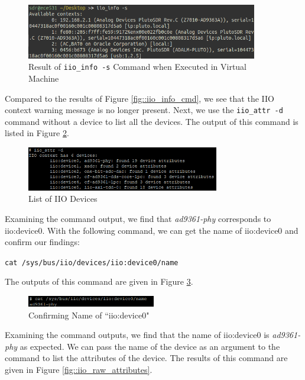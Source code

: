 \documentclass{article}
\begin{document}
\begin{figure}[H]
	\centerline{\includegraphics[width=0.9\textwidth]{iio_info_vm.png}}
	\caption{Result of \texttt{iio\_info -s} Command when Executed in Virtual Machine}
	\label{fig::iio_info_vm}
\end{figure}

Compared to the results of Figure \ref{fig::iio_info_cmd}, we see that the IIO context warning message is no longer present. Next, we use the \texttt{iio\_attr -d} command without a device to list all the devices. The output of this command is listed in Figure \ref{fig::iio_devices}.

\begin{figure}[H]
	\centerline{\includegraphics[width=0.75\textwidth]{iio_devices.png}}
	\caption{List of IIO Devices}
	\label{fig::iio_devices}
\end{figure}

Examining the command output, we find that \textit{ad9361-phy} corresponds to iio:device0. With the following command, we can get the name of iio:device0 and confirm our findings:

\begin{center}
\texttt{cat /sys/bus/iio/devices/iio:device0/name}
\end{center}

The outputs of this command are given in Figure \ref{fig::iio_device0_name}.

\begin{figure}[H]
	\centerline{\includegraphics[width=0.5\textwidth]{iio_device0_name.png}}
	\caption{Confirming Name of ``iio:device0"}
	\label{fig::iio_device0_name}
\end{figure}

Examining the command outputs, we find that the name of iio:device0 is \textit{ad9361-phy} as expected. We can pass the name of the device as an argument to the  command to list the attributes of the device. The results of this command are given in Figure \ref{fig::iio_raw_attributes}.
\end{document}
